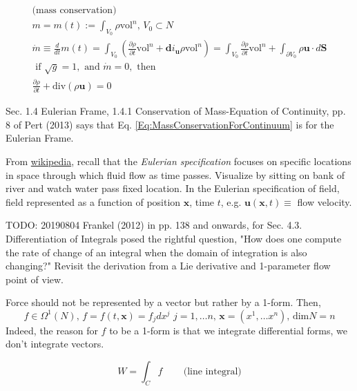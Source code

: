 \documentclass[10pt]{amsart}
\begin{document}
\begin{multicols*}{2}
\begin{equation}\label{Eq:MassConservationForContinuum}
\begin{gathered}
\text{(mass conservation)} \\
m = m(t) := \int_{V_0} \rho \text{vol}^n, \, V_0 \subset N \\
\dot{m} \equiv \frac{d}{dt}m(t) = \int_{V_0} \left( \frac{\partial \rho }{ \partial t} \text{vol}^n + \mathbf{d}i_{\mathbf{u}} \rho \text{vol}^n \right) = \boxed{ \int_{V_0} \frac{ \partial \rho }{ \partial t} \text{vol}^n + \int_{\partial V_0} \rho \mathbf{u} \cdot d\mathbf{S} } \\
\text{ if } \sqrt{g} = 1, \text{ and } \dot{m} = 0, \text{ then } \\
\frac{\partial \rho }{ \partial t} + \text{div}(\rho \mathbf{u}) = 0 
\end{gathered}
\end{equation}

Sec. 1.4 Eulerian Frame, 1.4.1 Conservation of Mass-Equation of Continuity, pp. 8 of Pert (2013) \cite{Pert2013} says that Eq. \ref{Eq:MassConservationForContinuum} is for the Eulerian Frame.

From \href{https://en.wikipedia.org/wiki/Lagrangian_and_Eulerian_specification_of_the_flow_field}{wikipedia}, recall that the \emph{Eulerian specification} focuses on specific locations in space through which fluid flow as time passes. Visualize by sitting on bank of river and watch water pass fixed location. In the Eulerian specification of field, field represented as a function of position $\mathbf{x}$, time $t$, e.g. $\mathbf{u}(\mathbf{x}, t) \equiv $ flow velocity.




TODO: 20190804 Frankel (2012) \cite{TFrankel2012} in pp. 138 and onwards, for Sec. 4.3. Differentiation of Integrals posed the rightful question, "How does one compute the rate of change of an integral when the domain of integration is also changing?" Revisit the derivation from a Lie derivative and 1-parameter flow point of view.

Force should not be represented by a vector but rather by a 1-form. Then, 
\[
f \in \Omega^1(N), \, f=f(t, \mathbf{x}) = f_j dx^j \, \, j=1, \dots n , \, \mathbf{x} = (x^1, \dots x^n), \, \text{dim}N = n
\]
Indeed, the reason for $f$ to be a 1-form is that we integrate differential forms, we don't integrate vectors. 

\begin{equation}
W = \int_C f \qquad \, \text{(line integral)}
\end{equation}


\end{multicols*}
\end{document}
